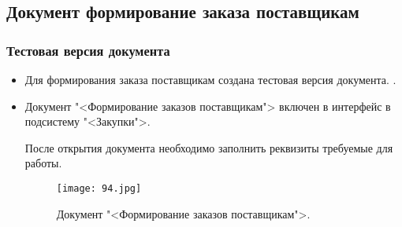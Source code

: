 \subsection{Документ формирование заказа поставщикам}
\subsubsection{Тестовая версия документа}
\begin{itemize}	
	\item Для формирования заказа поставщикам создана тестовая версия документа.
		.
	\item Документ "<Формирование заказов поставщикам"> включен в интерфейс в подсистему "<Закупки">. \par После открытия документа необходимо заполнить реквизиты требуемые для работы. 	
	\begin{figure}[H]
		\texttt{[image: 94.jpg]}
		\caption{Документ "<Формирование заказов поставщикам">.}
		\label{ris:94.jpg}
	\end{figure}


\end{itemize}
